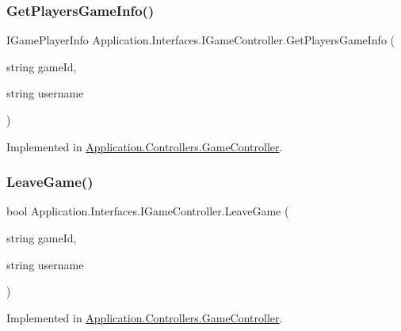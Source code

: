 \subsubsection{\texorpdfstring{Get\+Players\+Game\+Info()}{GetPlayersGameInfo()}}
{\footnotesize\ttfamily I\+Game\+Player\+Info Application.\+Interfaces.\+I\+Game\+Controller.\+Get\+Players\+Game\+Info (\begin{DoxyParamCaption}\item[{string}]{game\+Id,  }\item[{string}]{username }\end{DoxyParamCaption})}



Implemented in \mbox{\hyperlink{class_application_1_1_controllers_1_1_game_controller_aa0d0e2d74e14771144c1923c77186bb2}{Application.\+Controllers.\+Game\+Controller}}.

\mbox{\label{interface_application_1_1_interfaces_1_1_i_game_controller_ae81ea4aa4d3146c023277fbf17107623}} 
\subsubsection{\texorpdfstring{Leave\+Game()}{LeaveGame()}}
{\footnotesize\ttfamily bool Application.\+Interfaces.\+I\+Game\+Controller.\+Leave\+Game (\begin{DoxyParamCaption}\item[{string}]{game\+Id,  }\item[{string}]{username }\end{DoxyParamCaption})}



Implemented in \mbox{\hyperlink{class_application_1_1_controllers_1_1_game_controller_a5ed6117775253438a76aadcacd44a984}{Application.\+Controllers.\+Game\+Controller}}.

\mbox{\label{interface_application_1_1_interfaces_1_1_i_game_controller_ab3f492a78bbefc5de5dd3de5d1d26f79}} 
